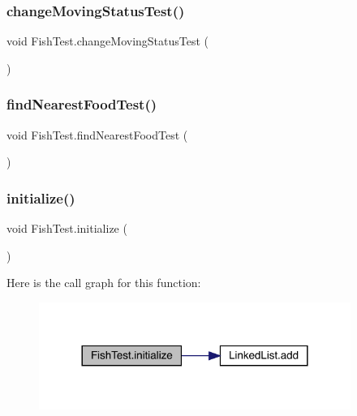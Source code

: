 \subsubsection{\texorpdfstring{change\+Moving\+Status\+Test()}{changeMovingStatusTest()}}
{\footnotesize\ttfamily void Fish\+Test.\+change\+Moving\+Status\+Test (\begin{DoxyParamCaption}{ }\end{DoxyParamCaption})\hspace{0.3cm}{\ttfamily [inline]}}

\mbox{\label{class_fish_test_af6db6a8b19fbc092877837f98576f3a8}} 
\subsubsection{\texorpdfstring{find\+Nearest\+Food\+Test()}{findNearestFoodTest()}}
{\footnotesize\ttfamily void Fish\+Test.\+find\+Nearest\+Food\+Test (\begin{DoxyParamCaption}{ }\end{DoxyParamCaption})\hspace{0.3cm}{\ttfamily [inline]}}

\mbox{\label{class_fish_test_a4bc3ecb470863af45697d2dc6b7c7542}} 
\subsubsection{\texorpdfstring{initialize()}{initialize()}}
{\footnotesize\ttfamily void Fish\+Test.\+initialize (\begin{DoxyParamCaption}{ }\end{DoxyParamCaption})\hspace{0.3cm}{\ttfamily [inline]}}

Here is the call graph for this function\+:
\nopagebreak
\begin{figure}[H]
\begin{center}
\leavevmode
\includegraphics[width=288pt]{class_fish_test_a4bc3ecb470863af45697d2dc6b7c7542_cgraph}
\end{center}
\end{figure}
\mbox{\label{class_fish_test_a1419dfc65a3ea1fd0c4f40a4e611320d}} 
